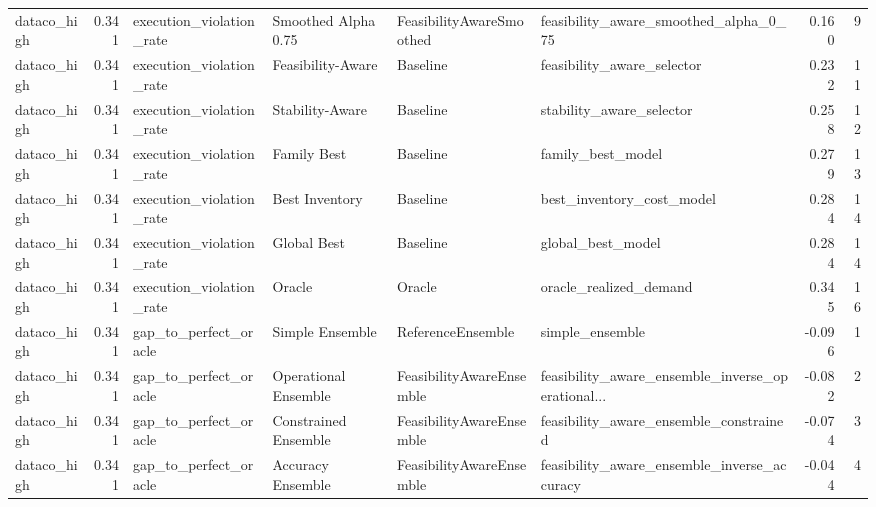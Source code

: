 \begin{table}
{\begin{tabular}{lrllllrr}
   dataco\_high &             0.341 &    execution\_violation\_rate &   Smoothed Alpha 0.75 &  FeasibilityAwareSmoothed &              feasibility\_aware\_smoothed\_alpha\_0\_75 &         0.160 &               9 \\
   dataco\_high &             0.341 &    execution\_violation\_rate &     Feasibility-Aware &                  Baseline &                         feasibility\_aware\_selector &         0.232 &              11 \\
   dataco\_high &             0.341 &    execution\_violation\_rate &       Stability-Aware &                  Baseline &                           stability\_aware\_selector &         0.258 &              12 \\
   dataco\_high &             0.341 &    execution\_violation\_rate &           Family Best &                  Baseline &                                  family\_best\_model &         0.279 &              13 \\
   dataco\_high &             0.341 &    execution\_violation\_rate &        Best Inventory &                  Baseline &                          best\_inventory\_cost\_model &         0.284 &              14 \\
   dataco\_high &             0.341 &    execution\_violation\_rate &           Global Best &                  Baseline &                                  global\_best\_model &         0.284 &              14 \\
   dataco\_high &             0.341 &    execution\_violation\_rate &                Oracle &                    Oracle &                             oracle\_realized\_demand &         0.345 &              16 \\
   dataco\_high &             0.341 &       gap\_to\_perfect\_oracle &       Simple Ensemble &         ReferenceEnsemble &                                    simple\_ensemble &        -0.096 &               1 \\
   dataco\_high &             0.341 &       gap\_to\_perfect\_oracle &  Operational Ensemble &  FeasibilityAwareEnsemble &  feasibility\_aware\_ensemble\_inverse\_operational... &        -0.082 &               2 \\
   dataco\_high &             0.341 &       gap\_to\_perfect\_oracle &  Constrained Ensemble &  FeasibilityAwareEnsemble &             feasibility\_aware\_ensemble\_constrained &        -0.074 &               3 \\
   dataco\_high &             0.341 &       gap\_to\_perfect\_oracle &     Accuracy Ensemble &  FeasibilityAwareEnsemble &        feasibility\_aware\_ensemble\_inverse\_accuracy &        -0.044 &               4 \\

\end{tabular}}
\end{table}
